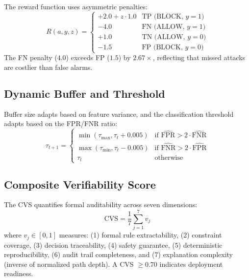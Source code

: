 \documentclass[conference]{IEEEtran}
\begin{document}
The reward function uses asymmetric penalties:
\begin{equation}
\label{eq:reward}
R(a, y, z) = \begin{cases}
+2.0 + z \cdot 1.0 & \text{TP (BLOCK, } y{=}1\text{)} \\
-4.0 & \text{FN (ALLOW, } y{=}1\text{)} \\
+1.0 & \text{TN (ALLOW, } y{=}0\text{)} \\
-1.5 & \text{FP (BLOCK, } y{=}0\text{)}
\end{cases}
\end{equation}
The FN penalty ($4.0$) exceeds FP ($1.5$) by $2.67\times$, reflecting that missed attacks are costlier than false alarms.

\subsection{Dynamic Buffer and Threshold}

Buffer size adapts based on feature variance, and the classification threshold adapts based on the FPR/FNR ratio:
\begin{equation}
\tau_{t+1} = \begin{cases}
\min(\tau_{\max}, \tau_t + 0.005) & \text{if } \widehat{\text{FPR}} > 2 \cdot \widehat{\text{FNR}} \\
\max(\tau_{\min}, \tau_t - 0.005) & \text{if } \widehat{\text{FNR}} > 2 \cdot \widehat{\text{FPR}} \\
\tau_t & \text{otherwise}
\end{cases}
\end{equation}

\subsection{Composite Verifiability Score}

The CVS quantifies formal auditability across seven dimensions:
\begin{equation}
\text{CVS} = \frac{1}{7} \sum_{j=1}^{7} v_j
\end{equation}
where $v_j \in [0,1]$ measures: (1) formal rule extractability, (2) constraint coverage, (3) decision traceability, (4) safety guarantee, (5) deterministic reproducibility, (6) audit trail completeness, and (7) explanation complexity (inverse of normalized path depth). A CVS $\geq 0.70$ indicates deployment readiness.


\end{document}
